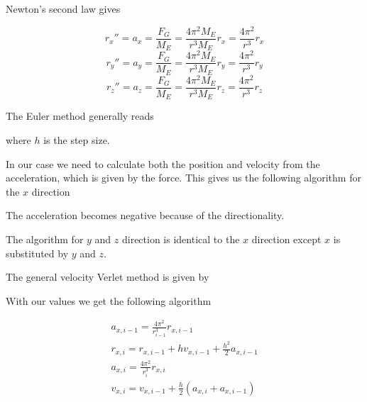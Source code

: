 \documentclass{article}
\begin{document}
Newton's second law gives

$$r_x''=a_x=\frac{F_G}{M_E}=\frac{4\pi^2M_E}{r^3M_E}r_x=\frac{4\pi^2}{r^3}r_x$$
$$r_y''=a_y=\frac{F_G}{M_E}=\frac{4\pi^2M_E}{r^3M_E}r_y=\frac{4\pi^2}{r^3}r_y$$
$$r_z''=a_z=\frac{F_G}{M_E}=\frac{4\pi^2M_E}{r^3M_E}r_z=\frac{4\pi^2}{r^3}r_z$$

\vskip0.5cm
The Euler method generally reads
\vskip0.5cm
\begin{algorithm}[H]
\end{algorithm}
\vskip0.5cm

where $h$ is the step size.

In our case we need to calculate both the position and velocity from the acceleration, which is given by the force. This gives us the following algorithm for the $x$ direction

\vskip0.5cm
\begin{algorithm}[H]
\end{algorithm}
\vskip0.5cm
The acceleration becomes negative because of the directionality.

The algorithm for $y$ and $z$ direction is identical to the $x$ direction except $x$ is substituted by $y$ and $z$.

\vskip0.7cm
The general velocity Verlet method is given by

\vskip0.5cm
\begin{algorithm}[H]
\end{algorithm}
\vskip0.5cm

With our values we get the following algorithm

\begin{equation*}
\begin{split}
a_{x,i-1}=\frac{4\pi^2}{r_{i-1}^3}r_{x,i-1}\\
r_{x,i}=r_{x,i-1}+hv_{x,i-1}+\frac{h^2}{2}a_{x,i-1}\\
a_{x,i}=\frac{4\pi^2}{r_i^3}r_{x,i}\\
v_{x,i}=v_{x,i-1}+\frac{h}{2}(a_{x,i}+a_{x,i-1})
\end{split}
\end{equation*}

\vskip0.5cm
\begin{algorithm}[H]
\end{algorithm}
\vskip0.5cm
\end{document}
